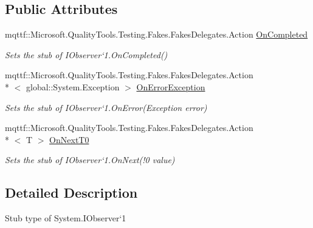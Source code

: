 \subsection*{Public Attributes}
\begin{DoxyCompactItemize}
\item 
mqttf\-::\-Microsoft.\-Quality\-Tools.\-Testing.\-Fakes.\-Fakes\-Delegates.\-Action \hyperlink{class_system_1_1_fakes_1_1_stub_i_observer_3_01_t_01_4_a6e1cc2e5ba3f069bc921a659cfa01b5a}{On\-Completed}
\begin{DoxyCompactList}\small\item\em Sets the stub of I\-Observer`1.On\-Completed()\end{DoxyCompactList}\item 
mqttf\-::\-Microsoft.\-Quality\-Tools.\-Testing.\-Fakes.\-Fakes\-Delegates.\-Action\\*
$<$ global\-::\-System.\-Exception $>$ \hyperlink{class_system_1_1_fakes_1_1_stub_i_observer_3_01_t_01_4_a6dd4ad9bbc18c386010d5764423cd54c}{On\-Error\-Exception}
\begin{DoxyCompactList}\small\item\em Sets the stub of I\-Observer`1.On\-Error(\-Exception error)\end{DoxyCompactList}\item 
mqttf\-::\-Microsoft.\-Quality\-Tools.\-Testing.\-Fakes.\-Fakes\-Delegates.\-Action\\*
$<$ T $>$ \hyperlink{class_system_1_1_fakes_1_1_stub_i_observer_3_01_t_01_4_a7d63e50d65e9348a2e1af200d566f096}{On\-Next\-T0}
\begin{DoxyCompactList}\small\item\em Sets the stub of I\-Observer`1.On\-Next(!0 value)\end{DoxyCompactList}\end{DoxyCompactItemize}


\subsection{Detailed Description}
Stub type of System.\-I\-Observer`1



